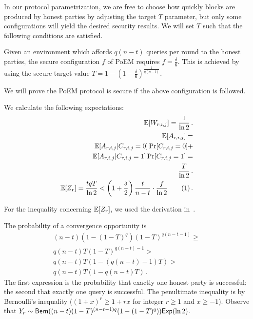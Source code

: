 In our protocol parametrization, we are free to choose how quickly blocks are produced
by honest parties by adjusting the target $T$ parameter, but only some configurations
will yield the desired security results. We will set $T$ such that the following
conditions are satisfied.

\begin{definition}
  Given an environment which affords $q (n - t)$ queries per round to
  the honest parties, the secure configuration $f$ of PoEM requires
  $f = \frac{\delta}{6}$. This is achieved by using the secure target
  value $T = 1 - (1 - \frac{\delta}{6})^{\frac{1}{q(n - t)}}$.
\end{definition}

We will prove the PoEM protocol is secure if the above configuration is
followed.

We calculate the following expectations:
\begin{align*}
  \E[W_{r, i, j}] = \frac{1}{\ln2}\,.\\
  \E[A_{r, i, j}] =\\
  \E[A_{r, i, j} | C_{r, i, j} = 0] \Pr[C_{r, i, j} = 0] +\\
  \E[A_{r, i, j} | C_{r, i, j} = 1] \Pr[C_{r, i, j} = 1] =\\
  \frac{T}{\ln2}\,.\\
  \E[Z_r] = \frac{tqT}{\ln2} < \left(1 + \frac{\delta}{2}\right)\frac{t}{n - t} \cdot \frac{f}{\ln2} \stepcounter{equation}\tag{\theequation}\label{eq.ex-z-bound} \,.
\end{align*}

For the inequality concerning $\mathop{{}\mathbb{E}}[Z_r]$, we used the derivation in~\cite{backbone}.

The probability of a convergence opportunity is
\begin{align*}
  (n - t) (1 - (1 - T)^q) (1 - T)^{q(n - t - 1)} \geq \\
  q(n - t) T (1 - T)^{q(n - t) - 1} > \\
  q(n - t) T (1 - (q(n - t) - 1)T) > \\
  q(n - t) T (1 - q(n - t)T)\,.
\end{align*}
The first expression is the probability that exactly one honest party is successful;
the second that exactly one query is successful. The penultimate inequality is by
Bernoulli's inequality ($(1 + x)^r \geq 1 + rx$ for integer $r \geq 1$ and $x \geq -1$).
Observe that $Y_r \sim \textsf{Bern}((n - t)(1 - T)^{(n - t - 1)q}(1 - (1 - T)^q)) \textsf{Exp}(\ln 2)$.

